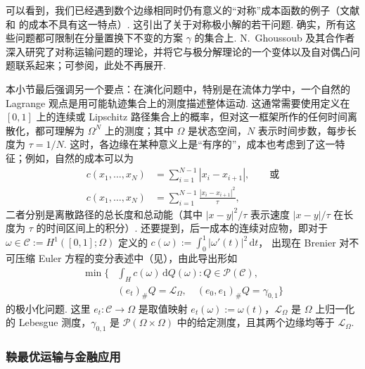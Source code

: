 可以看到，我们已经遇到数个边缘相同时仍有意义的“对称”成本函数的例子（文献\cite{b177} 和\cite{b109} 的成本不具有这一特点）. 这引出了关于对称极小解的若干问题. 确实，所有这些问题都可限制在分量置换下不变的方案 $\gamma$ 的集合上. N.~Ghoussoub 及其合作者深入研究了对称运输问题的理论，并将它与极分解理论的一个变体以及自对偶凸问题联系起来；可参阅\cite{b179,b180}，此处不再展开.

\label{idx:i98-p50}
本小节最后强调另一个要点：在演化问题中，特别是在流体力学中，一个自然的 Lagrange 观点是用可能轨迹集合上的测度描述整体运动. 这通常需要使用定义在 $[0,1]$ 上的连续或 Lipschitz 路径集合上的概率，但对这一框架所作的任何时间离散化，都可理解为 $\Omega^N$ 上的测度；其中 $\Omega$ 是状态空间，$N$ 表示时间步数，每步长度为 $\tau=1/N$. 这时，各边缘在某种意义上是“有序的”，成本也考虑到了这一特征；例如，自然的成本可以为
\begin{equation*}
\begin{aligned}
 c(x_1,\ldots,x_N)&=\sum_{i=1}^{N-1}|x_i-x_{i+1}|,\qquad\text{或}\\
 c(x_1,\ldots,x_N)&=\sum_{i=1}^{N-1}\frac{|x_i-x_{i+1}|^2}{\tau},
\end{aligned}
\end{equation*}
二者分别是离散路径的总长度和总动能（其中 $|x-y|^2/\tau$ 表示速度 $|x-y|/\tau$ 在长度为 $\tau$ 的时间区间上的积分）. 还要提到，后一成本的连续对应物，即对于 $\omega\in\mathscr C:=H^1([0,1];\Omega)$ 定义的 $c(\omega):=\int_0^1|\omega'(t)|^2\,\mathrm dt$，\label{idx:i78-p51}
出现在 Brenier 对不可压缩 Euler 方程的变分表述中（见\cite{b83}），由此导出形如
\begin{equation*}
\begin{aligned}
 \min\biggl\{&\int_Hc(\omega)\,\mathrm dQ(\omega):
        Q\in\mathscr P(\mathscr C),\\
       &(e_t)_\#Q=\mathscr L_\Omega,
         \quad(e_0,e_1)_\#Q=\gamma_{0,1}\biggr\}
\end{aligned}
\end{equation*}
的极小化问题. 这里 $e_t:\mathscr C\to\Omega$ 是取值映射 $e_t(\omega):=\omega(t)$，$\mathscr L_\Omega$ 是 $\Omega$ 上归一化的 Lebesgue 测度，$\gamma_{0,1}$ 是 $\mathscr P(\Omega\times\Omega)$ 中的给定测度，且其两个边缘均等于 $\mathscr L_\Omega$.

\subsubsection{鞅最优运输与金融应用}\label{sec:1.7.5}

